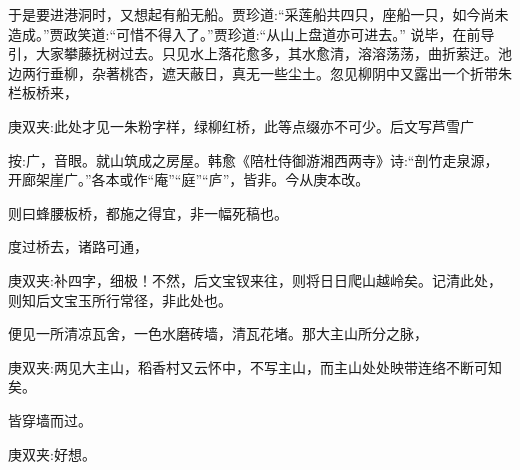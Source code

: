 \begin{parag}
    于是要进港洞时，又想起有船无船。贾珍道:“采莲船共四只，座船一只，如今尚未造成。”贾政笑道:“可惜不得入了。”贾珍道:“从山上盘道亦可进去。” 说毕，在前导引，大家攀藤抚树过去。只见水上落花愈多，其水愈清，溶溶荡荡，曲折萦迂。池边两行垂柳，杂著桃杏，遮天蔽日，真无一些尘土。忽见柳阴中又露出一个折带朱栏板桥来，\begin{note}庚双夹:此处才见一朱粉字样，绿柳红桥，此等点缀亦不可少。后文写芦雪广\end{note}\begin{subnote}按:广，音眼。就山筑成之房屋。韩愈《陪杜侍御游湘西两寺》诗:“剖竹走泉源，开廊架崖广。”各本或作“庵”“庭”“庐”，皆非。今从庚本改。\end{subnote}\begin{note}则曰蜂腰板桥，都施之得宜，非一幅死稿也。\end{note}度过桥去，诸路可通，\begin{note}庚双夹:补四字，细极！不然，后文宝钗来往，则将日日爬山越岭矣。记清此处，则知后文宝玉所行常径，非此处也。\end{note}便见一所清凉瓦舍，一色水磨砖墙，清瓦花堵。那大主山所分之脉，\begin{note}庚双夹:两见大主山，稻香村又云怀中，不写主山，而主山处处映带连络不断可知矣。\end{note}皆穿墙而过。\begin{note}庚双夹:好想。\end{note}
\end{parag}


